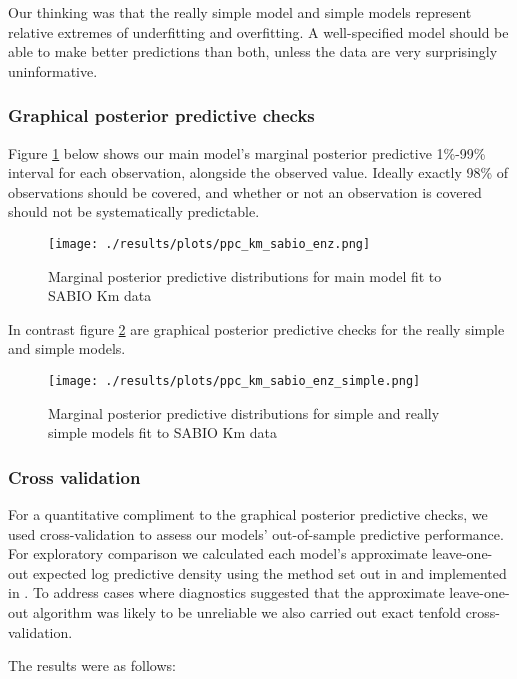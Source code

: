 \documentclass[11pt]{article}
\begin{document}
Our thinking was that the really simple model and simple models represent
relative extremes of underfitting and overfitting. A well-specified model should
be able to make better predictions than both, unless the data are very
surprisingly uninformative.

\subsubsection{Graphical posterior predictive checks}
\label{sec:org9b7eca4}
Figure \ref{fig:org829db47} below shows our main model's marginal posterior
predictive 1\%-99\% interval for each observation, alongside the observed
value. Ideally exactly 98\% of observations should be covered, and whether or not
an observation is covered should not be systematically predictable.

\begin{figure}[htbp]
\centering
\texttt{[image: ./results/plots/ppc\_km\_sabio\_enz.png]}
\caption{\label{fig:org829db47}Marginal posterior predictive distributions for main model fit to SABIO Km data}
\end{figure}

In contrast figure \ref{fig:org96eb4db} are graphical posterior predictive checks for the really simple
and simple models.

\begin{figure}[htbp]
\centering
\texttt{[image: ./results/plots/ppc\_km\_sabio\_enz\_simple.png]}
\caption{\label{fig:org96eb4db}Marginal posterior predictive distributions for simple and really simple models fit to SABIO Km data}
\end{figure}

\subsubsection{Cross validation}
\label{sec:org7c3b35d}
For a quantitative compliment to the graphical posterior predictive checks, we
used cross-validation to assess our models' out-of-sample predictive
performance. For exploratory comparison we calculated each model's approximate
leave-one-out expected log predictive density using the method set out in  and implemented in . To address cases where diagnostics
suggested that the approximate leave-one-out algorithm was likely to be
unreliable we also carried out exact tenfold cross-validation.

The results were as follows:
\end{document}
